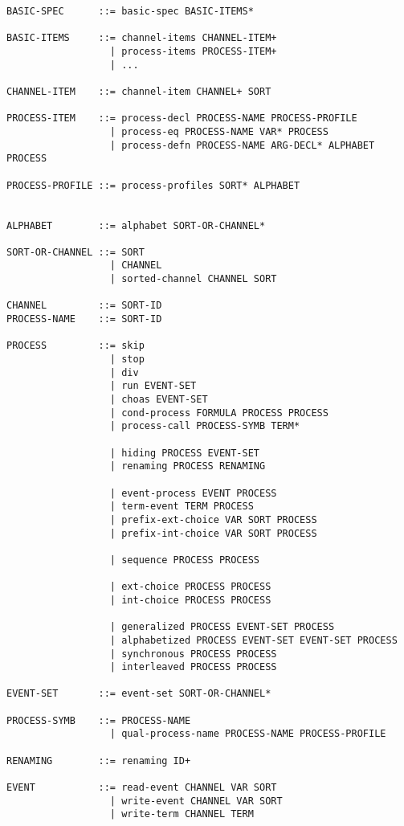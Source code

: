 \begin{verbatim}
BASIC-SPEC      ::= basic-spec BASIC-ITEMS*

BASIC-ITEMS     ::= channel-items CHANNEL-ITEM+
                  | process-items PROCESS-ITEM+
                  | ...

CHANNEL-ITEM    ::= channel-item CHANNEL+ SORT

PROCESS-ITEM    ::= process-decl PROCESS-NAME PROCESS-PROFILE
                  | process-eq PROCESS-NAME VAR* PROCESS
                  | process-defn PROCESS-NAME ARG-DECL* ALPHABET PROCESS

PROCESS-PROFILE ::= process-profiles SORT* ALPHABET


ALPHABET        ::= alphabet SORT-OR-CHANNEL*

SORT-OR-CHANNEL ::= SORT
                  | CHANNEL
                  | sorted-channel CHANNEL SORT

CHANNEL         ::= SORT-ID
PROCESS-NAME    ::= SORT-ID

PROCESS         ::= skip
                  | stop
                  | div
                  | run EVENT-SET
                  | choas EVENT-SET
                  | cond-process FORMULA PROCESS PROCESS
                  | process-call PROCESS-SYMB TERM*

                  | hiding PROCESS EVENT-SET
                  | renaming PROCESS RENAMING

                  | event-process EVENT PROCESS
                  | term-event TERM PROCESS
                  | prefix-ext-choice VAR SORT PROCESS
                  | prefix-int-choice VAR SORT PROCESS

                  | sequence PROCESS PROCESS

                  | ext-choice PROCESS PROCESS
                  | int-choice PROCESS PROCESS

                  | generalized PROCESS EVENT-SET PROCESS
                  | alphabetized PROCESS EVENT-SET EVENT-SET PROCESS
                  | synchronous PROCESS PROCESS
                  | interleaved PROCESS PROCESS

EVENT-SET       ::= event-set SORT-OR-CHANNEL*

PROCESS-SYMB    ::= PROCESS-NAME
                  | qual-process-name PROCESS-NAME PROCESS-PROFILE

RENAMING        ::= renaming ID+

EVENT           ::= read-event CHANNEL VAR SORT
                  | write-event CHANNEL VAR SORT
                  | write-term CHANNEL TERM
\end{verbatim}
